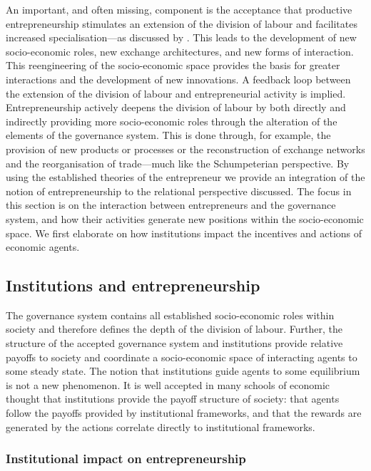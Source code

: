 An important, and often missing, component is the acceptance that productive entrepreneurship stimulates an extension of the division of labour and facilitates increased specialisation---as discussed by \citet{Smith1776}. This leads to the development of new socio-economic roles, new exchange architectures, and new forms of interaction. This reengineering of the socio-economic space provides the basis for greater interactions and the development of new innovations. A feedback loop between the extension of the division of labour and entrepreneurial activity is implied. Entrepreneurship actively deepens the division of labour by both directly and indirectly providing more socio-economic roles through the alteration of the elements of the governance system. This is done through, for example, the provision of new products or processes or the reconstruction of exchange networks and the reorganisation of trade---much like the Schumpeterian perspective. By using the established theories of the entrepreneur we provide an integration of the notion of entrepreneurship to the relational perspective discussed. The focus in this section is on the interaction between entrepreneurs and the governance system, and how their activities generate new positions within the socio-economic space. We first elaborate on how institutions impact the incentives and actions of economic agents.

\subsection{Institutions and entrepreneurship} \label{entrepreneurshipInstitutions}

The governance system contains all established socio-economic roles within society and therefore defines the depth of the division of labour. Further, the structure of the accepted governance system and institutions provide relative payoffs to society and coordinate a socio-economic space of interacting agents to some steady state. The notion that institutions guide agents to some equilibrium is not a new phenomenon. It is well accepted in many schools of economic thought that institutions provide the payoff structure of society: that agents follow the payoffs provided by institutional frameworks, and that the rewards are generated by the actions correlate directly to institutional frameworks.

\subsubsection{Institutional impact on entrepreneurship}

